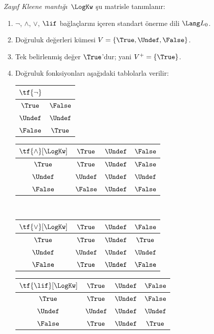 \begin{defn}
\emph{Zayıf Kleene mantığı}~$\LogKw$ şu matrisle tanımlanır:
\begin{enumerate}
  \item $\lnot$, $\land$, $\lor$, $\lif$ bağlaçlarını içeren standart
  önerme dili $\Lang L_0$.
  \item Doğruluk değerleri kümesi $V = \{\True, \Undef, \False\}$.
  \item Tek belirlenmiş değer $\True$'dur; yani $V^+ = \{\True\}$.
  \item Doğruluk fonksiyonları aşağıdaki tablolarla verilir:
  \begin{center}
    \begin{tabular}{c|c} 
      $\tf{\lnot}$ & \\ 
      \hline  
      $\True$ & $\False$ \\ 
      $\Undef$ & $\Undef$ \\
      $\False$ & $\True$ 
    \end{tabular}
    \quad
    \begin{tabular}{c|ccc} 
      $\tf{\land}[\LogKw]$ & $\True$ & $\Undef$ & $\False$ \\ 
      \hline 
      $\True$ & $\True$ & $\Undef$ & $\False$ \\ 
      $\Undef$ & $\Undef$ & $\Undef$ & $\Undef$\\ 
      $\False$ & $\False$ & $\Undef$ & $\False$ 
    \end{tabular}
    \\[2ex]
    \begin{tabular}{c|ccc} 
      $\tf{\lor}[\LogKw]$ & $\True$ & $\Undef$ & $\False$ \\ 
      \hline 
      $\True$ & $\True$ & $\Undef$ & $\True$ \\ 
      $\Undef$ & $\Undef$ & $\Undef$ & $\Undef$ \\
      $\False$ & $\True$ & $\Undef$ & $\False$ 
    \end{tabular}
    \quad
    \begin{tabular}{c|ccc} 
      $\tf{\lif}[\LogKw]$ & $\True$ & $\Undef$ & $\False$ \\ 
      \hline 
      $\True$ & $\True$ & $\Undef$ & $\False$ \\ 
      $\Undef$ & $\Undef$ & $\Undef$ & $\Undef$  \\ 
      $\False$ & $\True$ & $\Undef$ & $\True$ 
    \end{tabular}
  \end{center} 
\end{enumerate}
\end{defn}

